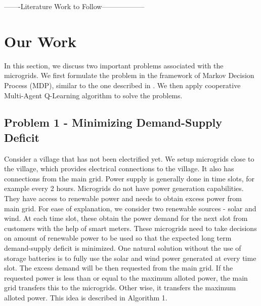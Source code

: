 \documentclass[conference]{IEEEtran}
\begin{document}
-------Literature Work to Follow------------------




\section{Our Work}
In this section, we discuss two important problems associated with the microgrids. We first formulate the problem in the framework of Markov Decision Process (MDP), similar to the one described in \cite{goodmdp}. We then apply cooperative Multi-Agent Q-Learning algorithm to solve the problems.

\subsection{Problem 1 - Minimizing Demand-Supply Deficit}

Consider a village that has not been electrified yet. We setup microgrids close to the village, which provides electrical connections to the village. It also has connections from the main grid. Power supply is generally done in time slots, for example every 2 hours. Microgrids do not have power generation capabilities. They have access to renewable power and needs to obtain excess power from main grid. For ease of explanation, we consider two renewable sources - solar and wind. At each time slot, these obtain the power demand for the next slot from customers with the help of smart meters. These microgrids need to take decisions on amount of renewable power to be used so that the expected long term demand-supply deficit is minimized.  
One natural solution without the use of storage batteries is to fully use the solar and wind power generated at every time slot. The excess demand will be then requested from the main grid. If the requested power is less than or equal to the maximum alloted power, the main grid transfers this to the microgrids. Other wise, it transfers the maximum alloted power. This idea is described in Algorithm 1.
\end{document}
